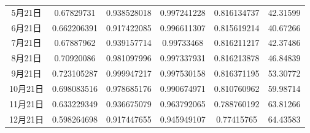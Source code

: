 \documentclass[withoutpreface,bwprint]{cumcmthesis} %
\begin{document}
\begin{table}[hptb]
\begin{tabular}{@{}cccccc@{}}
        5月21日                  & 0.67829731                                        & 0.938528018                                       & 0.997241228                                         & 0.816134737                                       & 42.31599                                                                            \\
        6月21日                  & 0.662206391                                       & 0.917422085                                       & 0.996611307                                         & 0.815619214                                       & 40.67266                                                                            \\
        7月21日                  & 0.67887962                                        & 0.939157714                                       & 0.99733468                                          & 0.816211217                                       & 42.37486                                                                            \\
        8月21日                  & 0.70920086                                        & 0.981097996                                       & 0.997337931                                         & 0.816213878                                       & 46.84839                                                                            \\
        9月21日                  & 0.723105287                                       & 0.999947217                                       & 0.997530158                                         & 0.816371195                                       & 53.30772                                                                            \\
        10月21日                 & 0.698083516                                       & 0.978685176                                       & 0.990674971                                         & 0.810760962                                       & 59.98714                                                                            \\
        11月21日                 & 0.633229349                                       & 0.936675079                                       & 0.963792065                                         & 0.788760192                                       & 63.81266                                                                            \\
        12月21日                 & 0.598264698                                       & 0.917447655                                       & 0.945949107                                         & 0.77415765                                        & 64.43583                                                                            \\ \bottomrule
    \end{tabular}
\end{table}
\end{document}
